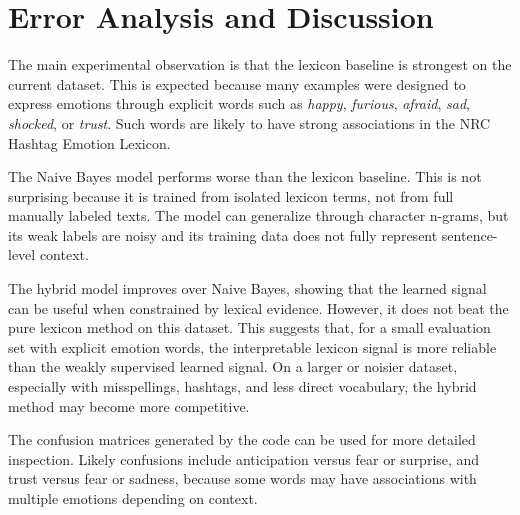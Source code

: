 \section{Error Analysis and Discussion}

The main experimental observation is that the lexicon baseline is strongest on the current dataset. This is expected because many examples were designed to express emotions through explicit words such as \textit{happy}, \textit{furious}, \textit{afraid}, \textit{sad}, \textit{shocked}, or \textit{trust}. Such words are likely to have strong associations in the NRC Hashtag Emotion Lexicon.

The Naive Bayes model performs worse than the lexicon baseline. This is not surprising because it is trained from isolated lexicon terms, not from full manually labeled texts. The model can generalize through character n-grams, but its weak labels are noisy and its training data does not fully represent sentence-level context.

The hybrid model improves over Naive Bayes, showing that the learned signal can be useful when constrained by lexical evidence. However, it does not beat the pure lexicon method on this dataset. This suggests that, for a small evaluation set with explicit emotion words, the interpretable lexicon signal is more reliable than the weakly supervised learned signal. On a larger or noisier dataset, especially with misspellings, hashtags, and less direct vocabulary, the hybrid method may become more competitive.

The confusion matrices generated by the code can be used for more detailed inspection. Likely confusions include anticipation versus fear or surprise, and trust versus fear or sadness, because some words may have associations with multiple emotions depending on context.
